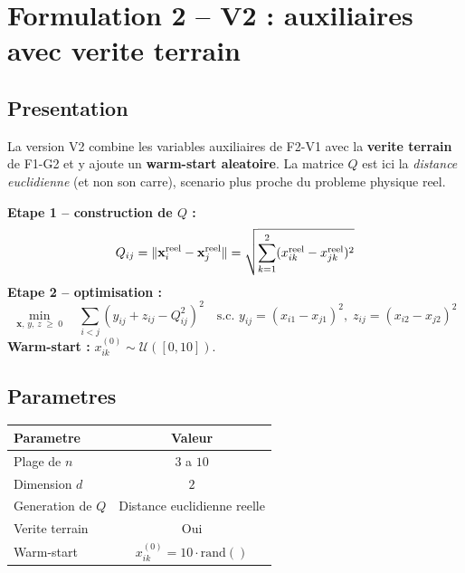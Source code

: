 \documentclass[12pt,a4paper]{article}
\begin{document}
\newpage

\section{Formulation 2 -- V2 : auxiliaires avec verite terrain}

\subsection{Presentation}

La version V2 combine les variables auxiliaires de F2-V1 avec la
\textbf{verite terrain} de F1-G2 et y ajoute un \textbf{warm-start
aleatoire}.  La matrice $Q$ est ici la \textit{distance euclidienne}
(et non son carre), scenario plus proche du probleme physique reel.

\begin{objetifbox}
\textbf{Etape 1 -- construction de $Q$ :}
\[
  Q_{ij}
  = \|\mathbf{x}_i^{\rm reel} - \mathbf{x}_j^{\rm reel}\|
  = \sqrt{\sum_{k=1}^{2}(x_{ik}^{\rm reel}-x_{jk}^{\rm reel})^2}
\]
\textbf{Etape 2 -- optimisation :}
\[
  \min_{\mathbf{x},\,y,\,z \;\geq\; 0} \quad
  \sum_{i<j}(y_{ij}+z_{ij}-Q_{ij}^2)^2
  \quad
  \text{s.c. } y_{ij}=(x_{i1}-x_{j1})^2,\;
               z_{ij}=(x_{i2}-x_{j2})^2
\]
\textbf{Warm-start :} $x_{ik}^{(0)}\sim\mathcal{U}([0,10])$.
\end{objetifbox}

\subsection{Parametres}

\begin{center}
\begin{tabular}{lc}
\toprule
\textbf{Parametre} & \textbf{Valeur} \\
\midrule
Plage de $n$          & $3$ a $10$ \\
Dimension $d$         & $2$ \\
Generation de $Q$     & Distance euclidienne reelle \\
Verite terrain        & Oui \\
Warm-start            & $x_{ik}^{(0)} = 10 \cdot \mathrm{rand}()$ \\
\bottomrule
\end{tabular}
\end{center}
\end{document}
